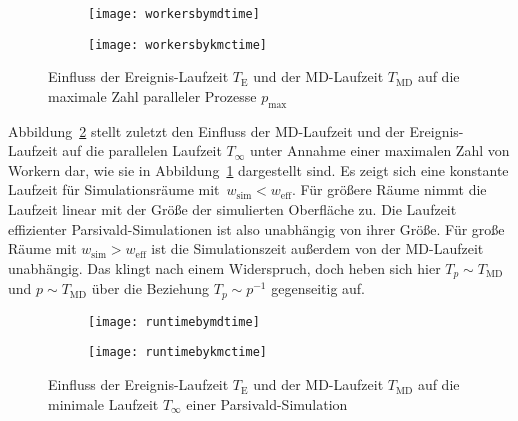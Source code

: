 \begin{figure}[p]

  \captionsetup[subfigure]{singlelinecheck=false}
  \def\subfigwidth{7cm}
  \begin{subfigure}[t]{\subfigwidth}
    \texttt{[image: workersbymdtime]}
  \end{subfigure}
  \hfill
  \begin{subfigure}[t]{\subfigwidth}
    \texttt{[image: workersbykmctime]}
  \end{subfigure}

  \caption{Einfluss der Ereignis-Laufzeit $T_\text{E}$ und der MD-Laufzeit $T_\text{MD}$ auf die maximale Zahl paralleler Prozesse $p_\text{max}$}
  \label{fig:workersbytime}

\end{figure}

Abbildung~\ref{fig:runtimebytime} stellt zuletzt den Einfluss der MD-Laufzeit und der Ereignis-Laufzeit auf die parallelen Laufzeit $T_\infty$ unter Annahme einer maximalen Zahl von Workern dar, wie sie in Abbildung~\ref{fig:workersbytime} dargestellt sind.
Es zeigt sich eine konstante Laufzeit für Simulationsräume mit~$w_\text{sim} < w_\text{eff}$.
Für größere Räume nimmt die Laufzeit linear mit der Größe der simulierten Oberfläche zu.
Die Laufzeit effizienter Parsivald-Simulationen ist also unabhängig von ihrer Größe.
Für große Räume mit $w_\text{sim} > w_\text{eff}$ ist die Simulationszeit außerdem von der MD-Laufzeit unabhängig.
Das klingt nach einem Widerspruch, doch heben sich hier $T_p \sim T_\text{MD}$ und $p \sim T_\text{MD}$ über die Beziehung $T_p \sim p^{-1}$ gegenseitig auf.

\begin{figure}[p]

  \captionsetup[subfigure]{singlelinecheck=false}
  \def\subfigwidth{7cm}
  \begin{subfigure}[t]{\subfigwidth}
    \texttt{[image: runtimebymdtime]}
  \end{subfigure}
  \hfill
  \begin{subfigure}[t]{\subfigwidth}
    \texttt{[image: runtimebykmctime]}
  \end{subfigure}

  \caption{Einfluss der Ereignis-Laufzeit $T_\text{E}$ und der MD-Laufzeit $T_\text{MD}$ auf die minimale Laufzeit $T_\infty$ einer Parsivald-Simulation}
  \label{fig:runtimebytime}

\end{figure}

